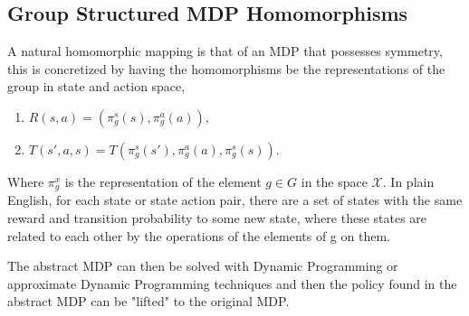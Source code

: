 \subsection{Group Structured MDP Homomorphisms}
A natural homomorphic mapping is that of an MDP that possesses symmetry, this is concretized by having the homomorphisms be the representations of the group in state and action space,
\begin{enumerate}
	\item $R(s, a) = (\pi^s_g(s), \pi_g^a(a))$,
	\item $T(s', a, s) =T(\pi_g^s(s'), \pi_g^a(a), \pi_g^s(s))$.
\end{enumerate}
Where $\pi_g^x$ is the representation of the element $g \in G$ in the space $\mathcal{X}$. In plain English, for each state or state action pair, there are a set of states with the same reward and transition probability to some new state, where these states are related to each other by the operations of the elements of g on them.



The abstract MDP can then be solved with Dynamic Programming or approximate Dynamic Programming techniques and then the policy found in the abstract MDP can be "lifted" to the original MDP.

